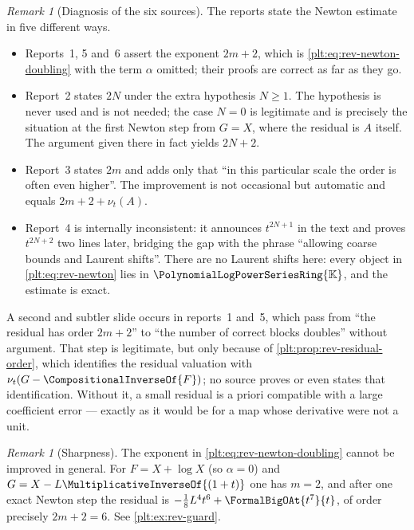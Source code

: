\documentclass[11pt,oneside]{article}
\theoremstyle{plain}
\theoremstyle{definition}
\theoremstyle{remark}
\newtheorem{remark}[theorem]{Remark}
\newcommand{\K}{\mathbb{K}}
\newcommand{\PLpow}{\PolynomialLogPowerSeriesRing{\K}}   %
\newcommand{\ordt}{\nu_{t}}                              %
\newcommand{\rev}[1]{\CompositionalInverseOf{#1}}
\begin{document}
\begin{remark}[Diagnosis of the six sources]
\label{plt:rmk:rev-doubling-diagnosis}
The reports state the Newton estimate in five different ways.

\begin{itemize}
\item Reports~1, 5 and~6 assert the exponent \(2m+2\), which is
\eqref{plt:eq:rev-newton-doubling} with the term \(\alpha\) omitted; their
proofs are correct as far as they go.
\item Report~2 states \(2N\) under the extra hypothesis \(N\ge1\).  The
hypothesis is never used and is not needed; the case \(N=0\) is legitimate and
is precisely the situation at the first Newton step from \(G=X\), where the
residual is \(A\) itself.  The argument given there in fact yields \(2N+2\).
\item Report~3 states \(2m\) and adds only that ``in this particular scale the
order is often even higher''.  The improvement is not occasional but automatic
and equals \(2m+2+\ordt(A)\).
\item Report~4 is internally inconsistent: it announces \(t^{2N+1}\) in the
text and proves \(t^{2N+2}\) two lines later, bridging the gap with the phrase
``allowing coarse bounds and Laurent shifts''.  There are no Laurent shifts
here: every object in \eqref{plt:eq:rev-newton} lies in \(\PLpow\), and the
estimate is exact.
\end{itemize}

A second and subtler slide occurs in reports~1 and~5, which pass from ``the
residual has order \(2m+2\)'' to ``the number of correct blocks doubles''
without argument.  That step is legitimate, but only because of
\cref{plt:prop:rev-residual-order}, which identifies the residual valuation
with \(\ordt(G-\rev{F})\); no source proves or even states that identification.
Without it, a small residual is a priori compatible with a large coefficient
error --- exactly as it would be for a map whose derivative were not a unit.
\end{remark}

\begin{remark}[Sharpness]
\label{plt:rmk:rev-doubling-sharp}
The exponent in \eqref{plt:eq:rev-newton-doubling} cannot be improved in
general.  For \(F=X+\log X\) (so \(\alpha=0\)) and
\(G=X-L\MultiplicativeInverseOf{(1+t)}\) one has \(m=2\), and after one exact
Newton step the residual is \(-\tfrac18L^4t^6+\FormalBigOAt{t^{7}}{t}\), of
order precisely \(2m+2=6\).  See \cref{plt:ex:rev-guard}.
\end{remark}
\end{document}
